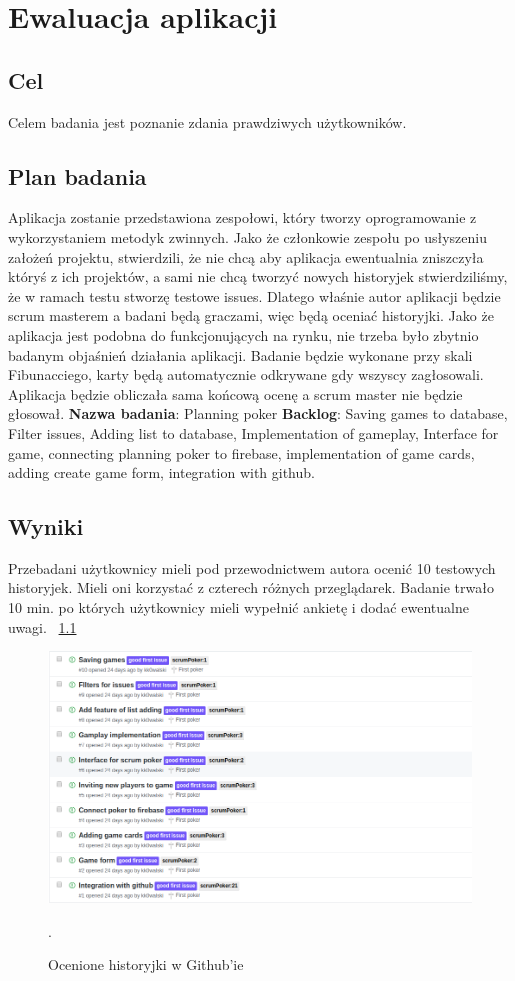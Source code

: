 \chapter{Ewaluacja aplikacji}

\section{Cel}
Celem badania jest poznanie zdania prawdziwych użytkowników.
\section{Plan badania}
Aplikacja zostanie przedstawiona zespołowi,
który tworzy oprogramowanie z wykorzystaniem metodyk zwinnych.
Jako że członkowie zespołu po usłyszeniu założeń projektu, stwierdzili,
że nie chcą aby aplikacja ewentualnia zniszczyła któryś z ich projektów,
a sami nie chcą tworzyć nowych historyjek stwierdziliśmy,
że w ramach testu stworzę testowe issues.
Dlatego właśnie autor aplikacji będzie scrum masterem a badani będą graczami,
więc będą oceniać historyjki.
Jako że aplikacja jest podobna do funkcjonujących na rynku,
nie trzeba było zbytnio badanym objaśnień działania aplikacji.
Badanie będzie wykonane przy skali Fibunacciego,
karty będą automatycznie odkrywane gdy wszyscy zagłosowali.
 Aplikacja będzie obliczała sama końcową ocenę a scrum master nie będzie głosował.
 \textbf{Nazwa badania}: Planning poker
 \textbf{Backlog}: Saving games to database, Filter issues, Adding list to database,
 Implementation of gameplay, Interface for game, connecting planning poker to firebase,
implementation of game cards, adding create game form, integration with github.
\section{Wyniki}
Przebadani użytkownicy mieli pod przewodnictwem autora ocenić 10 testowych historyjek.
Mieli oni korzystać z czterech różnych przeglądarek.
Badanie trwało 10 min. po których użytkownicy mieli wypełnić ankietę i dodać ewentualne uwagi.
~\ref{rys:wynikBadania}
\begin{figure}[H]
	\centering\includegraphics[width=.9\textwidth]{img/wynikBadania}
	\caption{Ocenione historyjki w Github'ie}.
	\label{rys:wynikBadania}
\end{figure}

